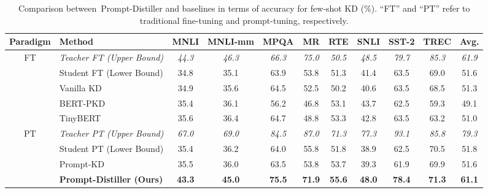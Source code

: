 \documentclass{article}
\begin{document}
\begin{table}
	\centering
	\begin{small}
		\begin{tabular}{c|l|cccccccc|c}
			\hline
			\textbf{Paradigm}   & \textbf{Method}                                     & \textbf{MNLI} & \textbf{MNLI-mm} & \textbf{MPQA} & \textbf{MR} & \textbf{RTE} & \textbf{SNLI} & \textbf{SST-2} & \textbf{TREC} & \textbf{Avg.} \\
			\hline
			\hline
			\multirow{5}{*}{FT} & \it Teacher FT (Upper Bound)                        & \it 44.3      & \it 46.3         & \it 66.3      & \it 75.0    & \it 50.5     & \it 48.5      & \it 79.7       & \it 85.3      & \it 61.9      \\
			                    & Student FT (Lower Bound)                            & 34.8          & 35.1             & 63.9          & 53.8        & 51.3         & 41.4          & 63.5           & 69.0          & 51.6          \\
			\cline{2-11}        & Vanilla KD~\cite{DBLP:journals/corr/abs-1903-12136} & 34.9          & 35.6             & 64.5          & 52.5        & 50.2         & 40.6          & 63.5           & 68.5          & 51.3          \\
			                    & BERT-PKD~\cite{DBLP:conf/emnlp/SunCGL19}            & 35.4          & 36.1             & 56.2          & 46.8        & 53.1         & 43.7          & 62.5           & 59.3          & 49.1          \\
			                    & TinyBERT~\cite{DBLP:conf/emnlp/JiaoYSJCL0L20}       & 35.6          & 36.4             & 64.7          & 48.8        & 53.3         & 42.8          & 63.5           & 63.2          & 51.0          \\
			\hline
			\multirow{4}{*}{PT} & \it Teacher PT (Upper Bound)                        & \it 67.0      & \it 69.0         & \it 84.5      & \it 87.0    & \it 71.3     & \it 77.3      & \it 93.1       & \it 85.8      & \it 79.3      \\
			                    & Student PT (Lower Bound)                            & 35.4          & 36.2             & 64.0          & 55.8        & 51.8         & 38.9          & 62.5           & 70.5          & 51.8          \\
			\cline{2-11}        & Prompt-KD                                           & 35.5          & 36.0             & 63.5          & 53.8        & 53.7         & 39.3          & 61.9           & 69.9          & 51.6          \\
			\cline{2-11}        & {\textbf{Prompt-Distiller (Ours)}}                  & \bf 43.3      & \bf 45.0         & \bf 75.5      & \bf 71.9    & \bf 55.6     & \bf 48.0      & \bf 78.4       & \bf 71.3      & \bf 61.1      \\
			\hline
		\end{tabular}
	\end{small}
	\caption{\label{tab:overall}Comparison between~{Prompt-Distiller} and baselines in terms of accuracy for few-shot KD (\%).
	``FT'' and ``PT'' refer to traditional fine-tuning and prompt-tuning, respectively.
	}
\end{table}
\end{document}
